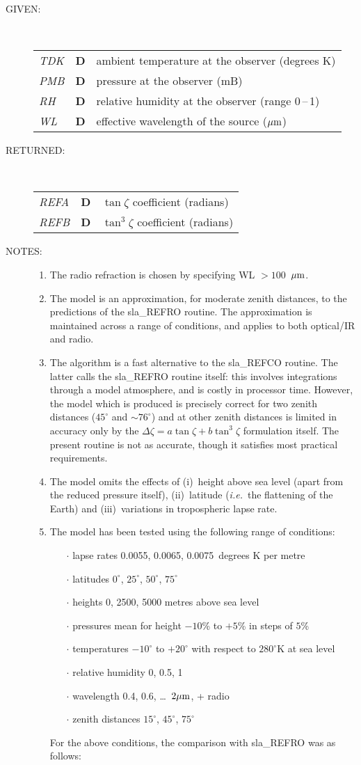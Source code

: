 \documentclass[11pt,twoside]{article}
\newlength{\oldspacing}
\newcommand{\args}[2]
{
  \goodbreak
  \setlength{\oldspacing}{\topsep}
  \setlength{\topsep}{0.3ex}
  \begin{description}
  \item[#1]:\\[1.5ex]
    \begin{tabular}{p{7em}p{6em}p{22em}}
      #2
    \end{tabular}
  \end{description}
  \setlength{\topsep}{\oldspacing}
}
\renewcommand{\args}[2]
   {
     \begin{description}
        \item[#1:]\\
        \begin{tabular}{p{7em}p{6em}l}
           #2
        \end{tabular}
     \end{description}
   }
\newcommand{\spec}[3]
{
  {\em {#1}} & {\bf \mbox{#2}} & {#3}
}
\newcommand{\notes}[1]
{
  \goodbreak
  \setlength{\oldspacing}{\topsep}
  \setlength{\topsep}{0.3ex}
  \begin{description}
    \item[NOTES]:
        #1
  \end{description}
  \setlength{\topsep}{\oldspacing}
}
\renewcommand{\notes}[1]
   {
      \begin{description}
         \item[NOTES:]
            #1
      \end{description}
   }
\begin{document}
\args{GIVEN}
{
 \spec{TDK}{D}{ambient temperature at the observer (degrees K)} \\
 \spec{PMB}{D}{pressure at the observer (mB)} \\
 \spec{RH}{D}{relative humidity at the observer (range 0\,--\,1)} \\
 \spec{WL}{D}{effective wavelength of the source ($\mu{\rm m}$)}
}
\args{RETURNED}
{
 \spec{REFA}{D}{$\tan \zeta$ coefficient (radians)} \\
 \spec{REFB}{D}{$\tan^{3} \zeta$ coefficient (radians)}
}
\notes
{
 \begin{enumerate}
  \item The radio refraction is chosen by specifying WL $>100$~$\mu{\rm m}$.
  \item The model is an approximation, for moderate zenith distances,
        to the predictions of the sla\_REFRO routine.  The approximation
        is maintained across a range of conditions, and applies to
        both optical/IR and radio.
  \item The algorithm is a fast alternative to the sla\_REFCO routine.
        The latter calls the sla\_REFRO routine itself:  this involves
        integrations through a model atmosphere, and is costly in
        processor time.  However, the model which is produced is precisely
        correct for two zenith distances ($45^\circ$ and $\sim\!76^\circ$)
        and at other zenith distances is limited in accuracy only by the
        $\Delta \zeta = a \tan \zeta + b \tan^{3} \zeta$ formulation
        itself.  The present routine is not as accurate, though it
        satisfies most practical requirements.
  \item The model omits the effects of (i)~height above sea level (apart
        from the reduced pressure itself), (ii)~latitude ({\it i.e.}\ the
        flattening of the Earth) and (iii)~variations in tropospheric
        lapse rate.
  \item The model has been tested using the following range of conditions:
        \begin{itemize}
        \item [$\cdot$] lapse rates 0.0055, 0.0065, 0.0075~degrees K per metre
        \item [$\cdot$] latitudes $0^\circ$, $25^\circ$, $50^\circ$, $75^\circ$
        \item [$\cdot$] heights 0, 2500, 5000 metres above sea level
        \item [$\cdot$] pressures mean for height $-10$\% to $+5$\% in steps of $5$\%
        \item [$\cdot$] temperatures $-10^\circ$ to $+20^\circ$ with respect to
              $280^\circ$K at sea level
        \item [$\cdot$] relative humidity 0, 0.5, 1
        \item [$\cdot$] wavelength 0.4, 0.6, \ldots\ $2\mu{\rm m}$, + radio
        \item [$\cdot$] zenith distances $15^\circ$, $45^\circ$, $75^\circ$
        \end{itemize}
        For the above conditions, the comparison with sla\_REFRO
        was as follows:


\end{enumerate}}
\end{document}
